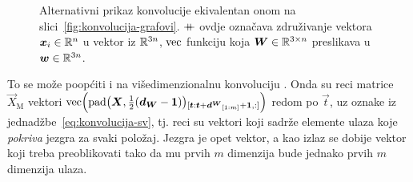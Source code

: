 \documentclass[utf8, diplomski, lmodern]{fer}
\begin{document}
\begin{figure}
	\centering
	\caption{Alternativni prikaz konvolucije ekivalentan onom na slici~\ref{fig:konvolucija-grafovi}. $\mathbin{+\mkern-10mu+}$ ovdje označava združivanje vektora $\vec x_i\in\R^n$ u vektor iz $\mathbb{R}^{3n}$, $\mathrm{vec}$ funkciju koja $\vec W\in\R^{3\times n}$ preslikava u $\vec w\in\R^{3n}$.}
	\label{fig:konvolucija-konk}
\end{figure}

To se može poopćiti i na višedimenzionalnu konvoluciju \citep{Sharan:2014:EPDL}. Onda su reci matrice $\vec X_\text{M}$ vektori $\vecfunc\del{\mathrm{pad}\del{\vec X, \tfrac{1}{2}\del{\vec d_{\vec W}-\cvec 1}}_\ind{\vec t:\vec t+\vec {d^{\vec W}}_\ind{1:m}+\cvec 1,:}}$ redom po $\vec t$, uz oznake iz jednadžbe~\eqref{eq:konvolucija-sv}, tj. reci su vektori koji sadrže elemente ulaza koje \textit{pokriva} jezgra za svaki položaj. Jezgra je opet vektor, a kao izlaz se dobije vektor koji treba preoblikovati tako da mu prvih $m$ dimenzija bude jednako prvih $m$ dimenzija ulaza.
\end{document}
